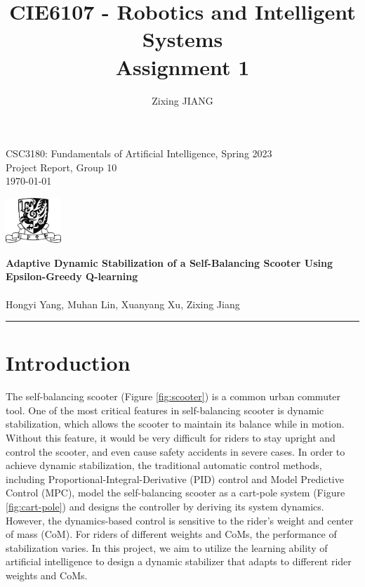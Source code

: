 \documentclass[10pt,a4paper]{article}
\title{\textbf{CIE6107 - Robotics and Intelligent Systems \\Assignment 1}}
\author{Zixing JIANG}
\begin{document}
	
\begin{flushleft}
	CSC3180: Fundamentals of Artificial Intelligence, Spring 2023\\
	Project Report, Group 10\\
	\today
\end{flushleft}
	
\begin{flushright}\vspace{-18mm}
	\includegraphics[height=1.7cm]{figure/logo.png}
\end{flushright}
	
\begin{center}\vspace{0.5cm}
	\textbf{\Large Adaptive Dynamic Stabilization of a Self-Balancing Scooter Using Epsilon-Greedy Q-learning}\\~\\
	\large Hongyi Yang, Muhan Lin, Xuanyang Xu, Zixing Jiang
\end{center}
{\noindent}\rule{\linewidth}{0.1mm}

\section{Introduction}
The self-balancing scooter (Figure \ref{fig:scooter}) is a common urban commuter tool. One of the most critical features in self-balancing scooter is dynamic stabilization,  which allows the scooter to maintain its balance while in motion. Without this feature, it would be very difficult for riders to stay upright and control the scooter, and even cause safety accidents in severe cases. In order to achieve dynamic stabilization, the traditional automatic control methods, including Proportional-Integral-Derivative (PID) control and Model Predictive Control (MPC), model the self-balancing scooter as a cart-pole system (Figure \ref{fig:cart-pole}) and designs the controller by deriving its system dynamics. However, the dynamics-based control is sensitive to the rider's weight and center of mass (CoM). For riders of different weights and CoMs, the performance of stabilization varies. In this project, we aim to utilize the learning ability of artificial intelligence to design a dynamic stabilizer that adapts to different rider weights and CoMs.
\end{document}
